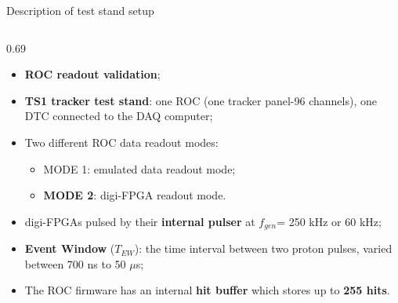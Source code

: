 \documentclass{beamer}
\begin{document}
 \begin{frame}{Description of test stand setup}
 \vspace{-3mm}
\begin{columns}
    \begin{column}{0.69\framewidth}
             \setlength{\leftmargini}{1.3em}
      \begin{itemize}
      \item \textbf{ROC readout validation};
      \vspace{1mm}
          \item \textbf{TS1 tracker test stand}: one ROC (one tracker panel-96 channels), one DTC connected to the DAQ computer;
             \vspace{1mm}
          \item  Two different ROC data readout modes:
          \begin{itemize}
              \item MODE 1: emulated data readout mode;
              \item \textbf{MODE 2}: digi-FPGA readout mode.
          \end{itemize}
             \vspace{1mm}
          \item digi-FPGAs pulsed by their \textbf{internal pulser} at $f_{gen}$= 250 kHz or 60 kHz;
             \vspace{1mm}
          \item \textbf{Event Window} ($T_{EW}$): the time interval between two proton pulses, varied between 700 ns to 50 $\mu$s;
             \vspace{1mm}
          \item The ROC firmware has an internal \textbf{hit buffer} which stores up to \textbf{255 hits}.


\end{itemize}
\end{column}
\end{columns}
\end{frame}
\end{document}
